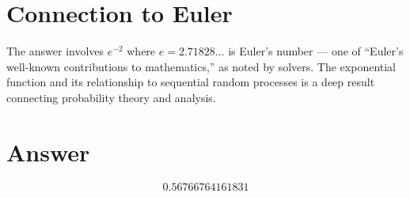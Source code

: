 \documentclass[11pt]{article}
\begin{document}
\section{Connection to Euler}

The answer involves $e^{-2}$ where $e = 2.71828\ldots$ is Euler's number --- one of ``Euler's well-known contributions to mathematics,'' as noted by solvers. The exponential function and its relationship to sequential random processes is a deep result connecting probability theory and analysis.

\section{Answer}

\[
\boxed{0.56766764161831}
\]
\end{document}
